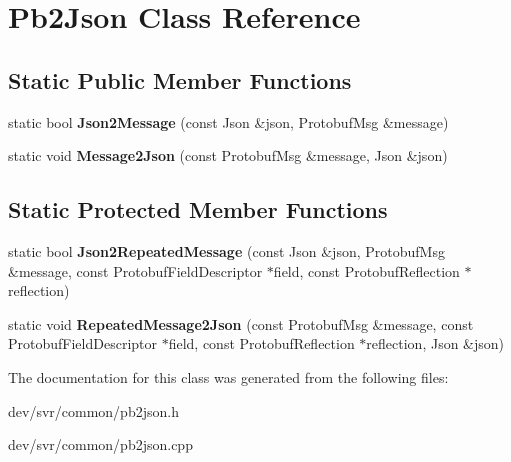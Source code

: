 \hypertarget{classPb2Json}{
\section{Pb2Json Class Reference}
\label{classPb2Json}
}
\subsection*{Static Public Member Functions}
\begin{DoxyCompactItemize}
\item 
\hypertarget{classPb2Json_a481b1b84286221d8b11b6b224d90ef61}{
static bool {\bfseries Json2Message} (const Json \&json, ProtobufMsg \&message)}
\label{classPb2Json_a481b1b84286221d8b11b6b224d90ef61}

\item 
\hypertarget{classPb2Json_a80957965cb005a70ee1e5be130e3af59}{
static void {\bfseries Message2Json} (const ProtobufMsg \&message, Json \&json)}
\label{classPb2Json_a80957965cb005a70ee1e5be130e3af59}

\end{DoxyCompactItemize}
\subsection*{Static Protected Member Functions}
\begin{DoxyCompactItemize}
\item 
\hypertarget{classPb2Json_a67fefc34ce95ac99626c7af7f0a89e36}{
static bool {\bfseries Json2RepeatedMessage} (const Json \&json, ProtobufMsg \&message, const ProtobufFieldDescriptor $\ast$field, const ProtobufReflection $\ast$reflection)}
\label{classPb2Json_a67fefc34ce95ac99626c7af7f0a89e36}

\item 
\hypertarget{classPb2Json_a878e9488b78eca4f4925985c2537f09c}{
static void {\bfseries RepeatedMessage2Json} (const ProtobufMsg \&message, const ProtobufFieldDescriptor $\ast$field, const ProtobufReflection $\ast$reflection, Json \&json)}
\label{classPb2Json_a878e9488b78eca4f4925985c2537f09c}

\end{DoxyCompactItemize}


The documentation for this class was generated from the following files:\begin{DoxyCompactItemize}
\item 
dev/svr/common/pb2json.h\item 
dev/svr/common/pb2json.cpp\end{DoxyCompactItemize}
